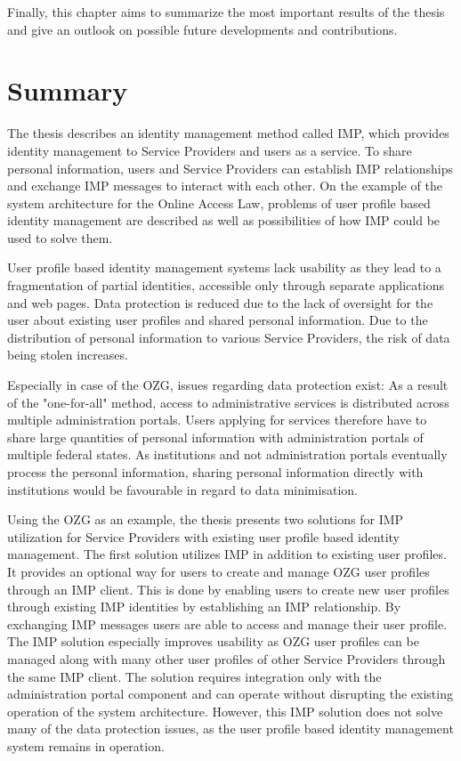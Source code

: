 Finally, this chapter aims to summarize the most important results of the thesis and give an outlook on possible future developments and contributions.

\section{Summary}

The thesis describes an identity management method called IMP, which provides identity management to Service Providers and users as a service. To share personal information, users and Service Providers can establish IMP relationships and exchange IMP messages to interact with each other. On the example of the system architecture for the Online Access Law, problems of user profile based identity management are described as well as possibilities of how IMP could be used to solve them.

User profile based identity management systems lack usability as they lead to a fragmentation of partial identities, accessible only through separate applications and web pages. Data protection is reduced due to the lack of oversight for the user about existing user profiles and shared personal information. Due to the distribution of personal information to various Service Providers, the risk of data being stolen increases.

Especially in case of the OZG, issues regarding data protection exist: As a result of the "one-for-all" method, access to administrative services is distributed across multiple administration portals. Users applying for services therefore have to share large quantities of personal information with administration portals of multiple federal states. As institutions and not administration portals eventually process the personal information, sharing personal information directly with institutions would be favourable in regard to data minimisation.

Using the OZG as an example, the thesis presents two solutions for IMP utilization for Service Providers with existing user profile based identity management.
The first solution utilizes IMP in addition to existing user profiles. It provides an optional way for users to create and manage OZG user profiles through an IMP client. This is done by enabling users to create new user profiles through existing IMP identities by establishing an IMP relationship. By exchanging IMP messages users are able to access and manage their user profile. The IMP solution especially improves usability as OZG user profiles can be managed along with many other user profiles of other Service Providers through the same IMP client. The solution requires integration only with the administration portal component and can operate without disrupting the existing operation of the system architecture. However, this IMP solution does not solve many of the data protection issues, as the user profile based identity management system remains in operation.

